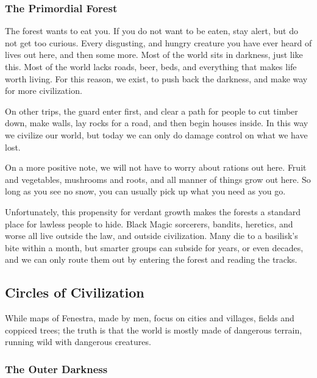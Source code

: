 \begin{multicols}{2}
\subsubsection{The Primordial Forest}

\begin{exampletext}

  The forest wants to eat you.
  If you do not want to be eaten, stay alert, but do not get too curious.
  Every disgusting, and hungry creature you have ever heard of lives out here, and then some more.
  Most of the world sits in darkness, just like this.
  Most of the world lacks roads, beer, beds, and everything that makes life worth living.
  For this reason, we exist, to push back the darkness, and make way for more civilization.

  On other trips, the \gls{guard} enter first, and clear a path for people to cut timber down, make walls, lay rocks for a road, and then begin houses inside.
  In this way we civilize our world, but today we can only do damage control on what we have lost.

  On a more positive note, we will not have to worry about rations out here.
  Fruit and vegetables, mushrooms and roots, and all manner of things grow out here.
  So long as you see no snow, you can usually pick up what you need as you go.

  Unfortunately, this propensity for verdant growth makes the forests a standard place for lawless people to hide.
  Black Magic sorcerers, bandits, heretics, and worse all live outside the law, and outside civilization.
  Many die to a basilisk's bite within a month, but smarter groups can subside for years, or even decades, and we can only route them out by entering the forest and reading the tracks.

\end{exampletext}

\subsection{Circles of Civilization}

While maps of Fenestra, made by men, focus on cities and villages, fields and coppiced trees; the truth is that the world is mostly made of dangerous terrain, running wild with dangerous creatures.

\subsubsection{The Outer Darkness}


\end{multicols}
